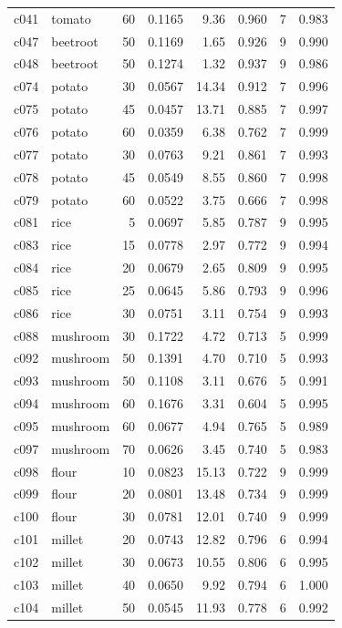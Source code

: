 \begin{longtable}{llrrrrrr}
c041 & tomato & 60 & 0.1165 & 9.36 & 0.960 & 7 & 0.983 \\
c047 & beetroot & 50 & 0.1169 & 1.65 & 0.926 & 9 & 0.990 \\
c048 & beetroot & 50 & 0.1274 & 1.32 & 0.937 & 9 & 0.986 \\
c074 & potato & 30 & 0.0567 & 14.34 & 0.912 & 7 & 0.996 \\
c075 & potato & 45 & 0.0457 & 13.71 & 0.885 & 7 & 0.997 \\
c076 & potato & 60 & 0.0359 & 6.38 & 0.762 & 7 & 0.999 \\
c077 & potato & 30 & 0.0763 & 9.21 & 0.861 & 7 & 0.993 \\
c078 & potato & 45 & 0.0549 & 8.55 & 0.860 & 7 & 0.998 \\
c079 & potato & 60 & 0.0522 & 3.75 & 0.666 & 7 & 0.998 \\
c081 & rice & 5 & 0.0697 & 5.85 & 0.787 & 9 & 0.995 \\
c083 & rice & 15 & 0.0778 & 2.97 & 0.772 & 9 & 0.994 \\
c084 & rice & 20 & 0.0679 & 2.65 & 0.809 & 9 & 0.995 \\
c085 & rice & 25 & 0.0645 & 5.86 & 0.793 & 9 & 0.996 \\
c086 & rice & 30 & 0.0751 & 3.11 & 0.754 & 9 & 0.993 \\
c088 & mushroom & 30 & 0.1722 & 4.72 & 0.713 & 5 & 0.999 \\
c092 & mushroom & 50 & 0.1391 & 4.70 & 0.710 & 5 & 0.993 \\
c093 & mushroom & 50 & 0.1108 & 3.11 & 0.676 & 5 & 0.991 \\
c094 & mushroom & 60 & 0.1676 & 3.31 & 0.604 & 5 & 0.995 \\
c095 & mushroom & 60 & 0.0677 & 4.94 & 0.765 & 5 & 0.989 \\
c097 & mushroom & 70 & 0.0626 & 3.45 & 0.740 & 5 & 0.983 \\
c098 & flour & 10 & 0.0823 & 15.13 & 0.722 & 9 & 0.999 \\
c099 & flour & 20 & 0.0801 & 13.48 & 0.734 & 9 & 0.999 \\
c100 & flour & 30 & 0.0781 & 12.01 & 0.740 & 9 & 0.999 \\
c101 & millet & 20 & 0.0743 & 12.82 & 0.796 & 6 & 0.994 \\
c102 & millet & 30 & 0.0673 & 10.55 & 0.806 & 6 & 0.995 \\
c103 & millet & 40 & 0.0650 & 9.92 & 0.794 & 6 & 1.000 \\
c104 & millet & 50 & 0.0545 & 11.93 & 0.778 & 6 & 0.992 \\

\end{longtable}
